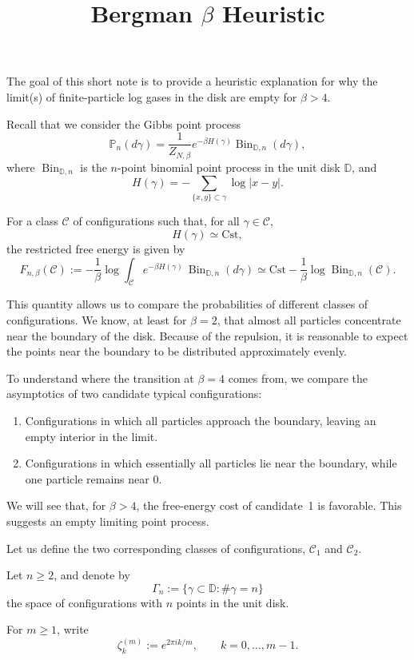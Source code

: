 \documentclass{article}
\title{Bergman $\beta$ Heuristic}
\author{}
\date{}
\renewcommand{\P}{\mathbb{P}}
\newcommand{\D}{\mathbb{D}}
\newcommand{\Bin}{\operatorname{Bin}}
\begin{document}
\maketitle

The goal of this short note is to provide a heuristic explanation for why the limit(s) of finite-particle log gases in the disk are empty for $\beta>4$.

Recall that we consider the Gibbs point process
\[
\P_n(d\gamma)
=
\frac{1}{Z_{N,\beta}}
e^{-\beta H(\gamma)}
\Bin_{\D,n}(d\gamma),
\]
where $\Bin_{\D,n}$ is the $n$-point binomial point process in the unit disk $\D$, and
\[
H(\gamma)
=
-\sum_{\{x,y\}\subset\gamma}\log |x-y|.
\]

For a class $\mathcal{C}$ of configurations such that, for all
$\gamma\in\mathcal{C}$,
\[
H(\gamma)\simeq \mathrm{Cst},
\]
the restricted free energy is given by
\[
F_{n,\beta}(\mathcal{C})
:=
-\frac{1}{\beta}
\log\!\int_{\mathcal{C}}
e^{-\beta H(\gamma)}
\,\Bin_{\D,n}(d\gamma)
\simeq
\mathrm{Cst}
-\frac{1}{\beta}
\log \Bin_{\D,n}(\mathcal{C}).
\]

This quantity allows us to compare the probabilities of different classes of configurations. We know, at least for $\beta=2$, that almost all particles concentrate near the boundary of the disk. Because of the repulsion, it is reasonable to expect the points near the boundary to be distributed approximately evenly.

To understand where the transition at $\beta=4$ comes from, we compare the asymptotics of two candidate typical configurations:
\begin{enumerate}
    \item Configurations in which all particles approach the boundary, leaving an empty interior in the limit.
    \item Configurations in which essentially all particles lie near the boundary, while one particle remains near $0$.
\end{enumerate}
We will see that, for $\beta>4$, the free-energy cost of candidate~1 is favorable. This suggests an empty limiting point process.

Let us define the two corresponding classes of configurations, $\mathcal{C}_1$ and $\mathcal{C}_2$.

Let $n\geq 2$, and denote by
\[
\Gamma_n
:=
\{\gamma\subset\D:\#\gamma=n\}
\]
the space of configurations with $n$ points in the unit disk.

For $m\geq 1$, write
\[
\zeta_k^{(m)}
:=
e^{2\pi i k/m},
\qquad
k=0,\ldots,m-1.
\]
\end{document}

